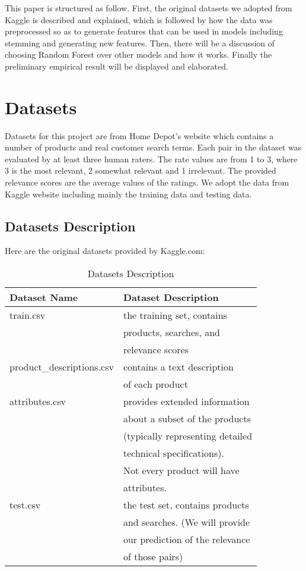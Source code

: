 \documentclass{sig-alternate-05-2015}
\begin{document}
This paper is structured as follow. First, the original datasets we adopted from Kaggle is described and explained, which is followed by how the data was preprocessed so as to generate features that can be used in models including stemming and generating new features. Then, there will be a discussion of choosing Random Forest over other models and how it works. Finally the preliminary empirical result will be displayed and elaborated. 

\section{Datasets}
Datasets for this project are from Home Depot's website which contains a number of products and real customer search terms. Each pair in the dataset was evaluated by at least three human raters. The rate values are from 1 to 3, where 3 is the most relevant, 2 somewhat relevant and 1 irrelevant. The provided relevance scores are the average values of the ratings. We adopt the data from Kaggle website including mainly the training data and testing data.\\

\subsection{Datasets Description}
Here are the original datasets provided by Kaggle.com:
\begin{table}[ht]
\centering
\caption{Datasets Description}
\label{my-label}
\begin{tabular}{|l|l|}
\hline
\textbf{Dataset Name}  & \textbf{Dataset Description}  \\ \hline
train.csv 		   	  & the training set, contains \\
			           & products, searches, and \\
			           & relevance scores \\ \hline
product\_descriptions.csv & contains a text description \\
				& of each product \\ \hline
attributes.csv      	   & provides extended information \\
 				   & about a subset of the products \\
				   & (typically representing detailed\\
				   &  technical specifications). \\
				   & Not every product will have \\
				   & attributes.\\ \hline
test.csv 	   		&  the test set, contains products \\
				& and searches. (We will provide \\
				& our prediction of the relevance \\
				& of those pairs)\\ \hline
\end{tabular}
\end{table}
\end{document}
